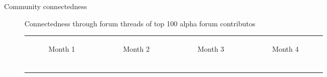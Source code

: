 \changepapersize{305.3mm:210mm}

\begin{minipage}{147.3mm}
{
	\LARGE
	\noindent Community connectedness \par
}
\begin{figure}[H]
	\centering
	
	\caption{Connectedness through forum threads of top 100 alpha forum contributos}
	\label{figure:year}
\end{figure}
\end{minipage}

\newpage
\begin{minipage}[t]{0.7\textwidth}
\begin{figure}[H]
  \begin{adjustbox}{width=\textwidth, keepaspectratio}
      \begin{tabular}{cccc}
          \begin{subfigure}[b]{0.24\textwidth}
              \centering
              
              \caption{Month 1}
              \label{fig:month1}
          \end{subfigure} &
          \begin{subfigure}[b]{0.24\textwidth}
              \centering
              
              \caption{Month 2}
              \label{fig:month2}
          \end{subfigure} &
          \begin{subfigure}[b]{0.24\textwidth}
              \centering
              
              \caption{Month 3}
              \label{fig:month3}
          \end{subfigure} &
          \begin{subfigure}[b]{0.24\textwidth}
              \centering
              
              \caption{Month 4}
              \label{fig:month4}
          \end{subfigure} \\
          \begin{subfigure}[b]{0.24\textwidth}
              \centering
              

\end{subfigure}
\end{tabular}
\end{adjustbox}
\end{figure}
\end{minipage}

